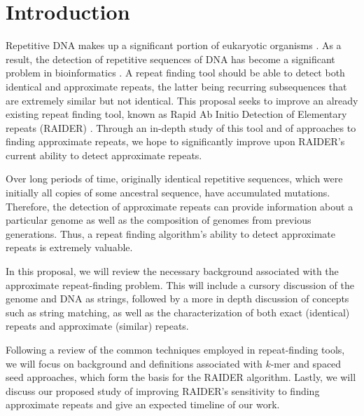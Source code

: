 \chapter{Introduction}
\label{intro}
Repetitive DNA makes up a significant portion of eukaryotic organisms \cite{britten1968repeated}. As a result, the detection of repetitive sequences of DNA has become a significant problem in bioinformatics \cite{pevzner2004de-novo}. A repeat finding tool should be able to detect both identical and approximate repeats, the latter being recurring subsequences that are extremely similar but not identical. This proposal seeks to improve an already existing repeat finding tool, known as Rapid Ab Initio Detection of Elementary repeats (RAIDER) \cite{figueroa2013raider}. Through an in-depth study of this tool and of approaches to finding approximate repeats, we hope to significantly improve upon RAIDER's current ability to detect approximate repeats.

Over long periods of time, originally identical repetitive sequences, which were initially all copies of some ancestral sequence, have accumulated mutations. Therefore, the detection of approximate repeats can provide information about a particular genome as well as the composition of genomes from previous generations. Thus, a repeat finding algorithm's ability to detect approximate repeats is extremely valuable.

In this proposal, we will review the necessary background associated with the approximate repeat-finding problem. This will include a cursory discussion of the genome and DNA as strings, followed by a more in depth discussion of concepts such as string matching, as well as the characterization of both exact (identical) repeats and approximate (similar) repeats. 

Following a review of the common techniques employed in repeat-finding tools, we will focus on background and definitions associated with $k$-mer and spaced seed approaches, which form the basis for the RAIDER algorithm. Lastly, we will discuss our proposed study of improving RAIDER's sensitivity to finding approximate repeats and give an expected timeline of our work.

\clearpage